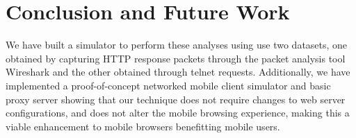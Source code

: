 \section{Conclusion and Future Work}
\label{sec:conclusion}
We have built a simulator to perform these analyses using use two datasets, one obtained by capturing HTTP response packets through the packet analysis tool Wireshark and the other obtained through telnet requests. 
Additionally, we have implemented a proof-of-concept networked mobile client simulator and basic proxy server showing that our technique does not require changes to web server configurations, and does not alter the mobile browsing experience, making this a viable enhancement to mobile browsers benefitting mobile users.
\cite{manber}

